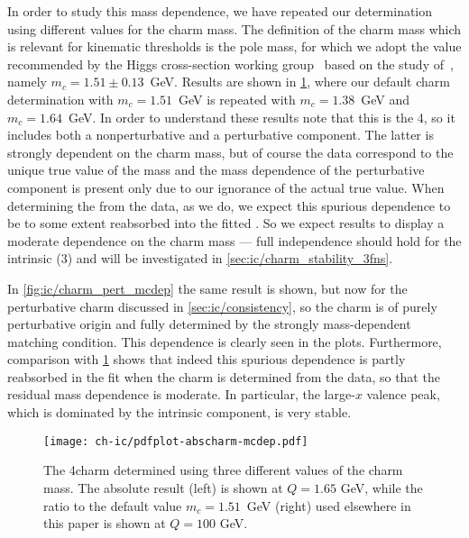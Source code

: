In order to study this mass dependence, we have repeated our determination using different values for the charm mass.
The definition of the charm mass which is relevant for kinematic
thresholds is the pole mass, for which we adopt the value recommended
by the Higgs cross-section working group~\cite{deFlorian:2016spz}
based on the study of~\cite{Bauer:2004ve}, namely
 $m_c = 1.51 \pm 0.13$~GeV. 
%
Results are shown in \cref{fig:ic/charm_fitted_mcdep}, where
our default charm \pdf determination with  $m_c = 1.51$~GeV is
repeated with $m_c=1.38$~GeV and
$m_c=1.64$~GeV.
%
In order to understand these results note that this is
the 4\fns \pdf, so it includes 
both a nonperturbative and a perturbative component. The latter is
strongly dependent on the charm mass, but of course the data
correspond to the unique true value of the mass and the mass
dependence of the perturbative component is present only due to our
ignorance of the actual true value. When determining the \pdf from the
data, as we do, we expect this spurious dependence to be to some extent
reabsorbed into the fitted \pdf. So we expect results to display a
moderate dependence on the charm mass --- full independence should
hold for the intrinsic (3\fns) \pdf and will be investigated in
\cref{sec:ic/charm_stability_3fns}. 

In \cref{fig:ic/charm_pert_mcdep} the same result is shown, but now
for the perturbative charm \pdf discussed in
\cref{sec:ic/consistency},  so the charm \pdf is of
purely perturbative origin and fully determined by the strongly
mass-dependent matching condition. This dependence is clearly seen in
the plots. Furthermore, comparison with
\cref{fig:ic/charm_fitted_mcdep} shows that indeed this spurious
dependence is partly reabsorbed in the fit when the charm \pdf is
determined from the data, so that  the residual mass dependence is moderate.
In particular, the large-$x$ valence peak, which is dominated by the
intrinsic component, is very stable.

\begin{figure}[t]
  \begin{center}
    \texttt{[image: ch-ic/pdfplot-abscharm-mcdep.pdf]}
    \caption{\small The 4\fns charm \pdf determined
    using three different values of the charm mass. The absolute
    result (left) is shown at $Q=1.65$ GeV, while the ratio to the 
       default value
       $m_c=1.51$~GeV (right) used elsewhere in this paper is shown at $Q=100$ GeV.
   \label{fig:ic/charm_fitted_mcdep} }
\end{center}
\end{figure}

